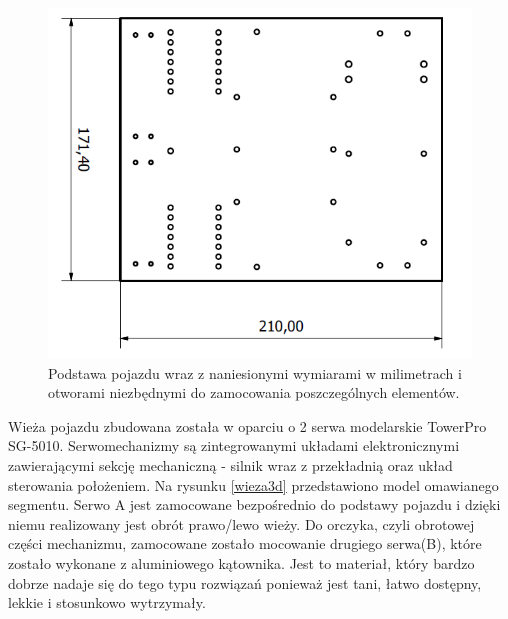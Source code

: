   \begin{figure}[H]
    \begin{center}
      \includegraphics[scale=0.5]{imgs/podstawa.png}
 	\caption[Podstawa pojazdu.]{\small{Podstawa pojazdu wraz z naniesionymi wymiarami w milimetrach i otworami niezbędnymi do zamocowania poszczególnych elementów.}}
	\label{podst3d}
    \end{center}
  \end{figure}
Wieża pojazdu zbudowana została w oparciu o 2 serwa modelarskie TowerPro SG-5010. Serwomechanizmy są zintegrowanymi układami elektronicznymi zawierającymi sekcję mechaniczną - silnik wraz z przekładnią oraz układ sterowania położeniem.
Na rysunku \ref{wieza3d} przedstawiono model omawianego segmentu. Serwo A jest zamocowane bezpośrednio do podstawy pojazdu i dzięki niemu realizowany jest obrót prawo/lewo wieży. Do orczyka, czyli obrotowej części mechanizmu, zamocowane zostało mocowanie drugiego serwa(B), które zostało wykonane z aluminiowego kątownika. Jest to materiał, który bardzo dobrze nadaje się do tego typu rozwiązań ponieważ jest tani, łatwo dostępny, lekkie i stosunkowo wytrzymały.  

